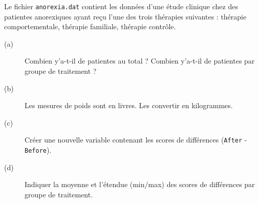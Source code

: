 \begin{exo}\label{exo:1.5}
Le fichier \texttt{anorexia.dat} contient les données d'une étude clinique
chez des patientes anorexiques ayant reçu l'une des trois thérapies
suivantes : thérapie comportementale, thérapie familiale, thérapie
contrôle.\autocite{hand93} 
\begin{description}
\item[(a)] Combien y'a-t-il de patientes au total ? Combien y'a-t-il de
  patientes par groupe de traitement ?
\item[(b)] Les mesures de poids sont en livres. Les convertir en
  kilogrammes.    
\item[(c)] Créer une nouvelle variable contenant les scores de différences
  (\texttt{After} - \texttt{Before}).
\item[(d)] Indiquer la moyenne et l'étendue (min/max) des scores de
  différences par groupe de traitement.
\end{description}
\end{exo}

